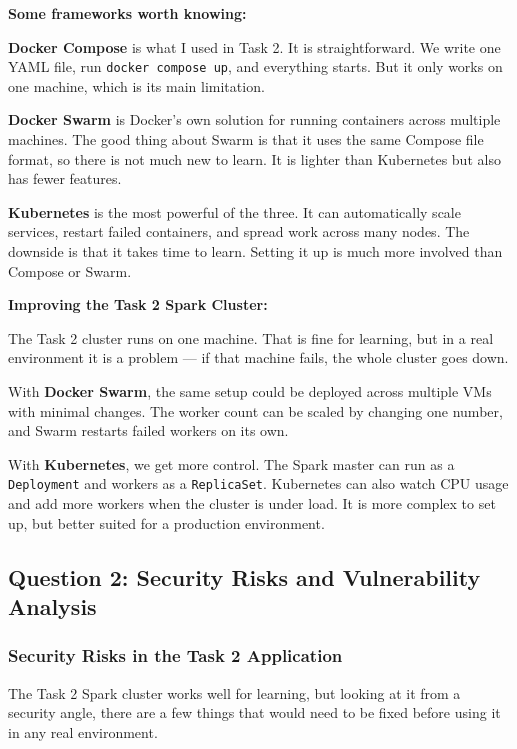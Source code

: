 \documentclass[11pt,a4paper]{article}
\begin{document}
\bigskip
\noindent\textbf{Some frameworks worth knowing:}

\textbf{Docker Compose} is what I used in Task 2. It is straightforward.
We write one YAML file, run \texttt{docker compose up}, and everything starts.
But it only works on one machine, which is its main limitation.

\textbf{Docker Swarm} is Docker's own solution for running containers across
multiple machines. The good thing about Swarm is that it uses the same Compose
file format, so there is not much new to learn. It is lighter than Kubernetes
but also has fewer features.

\textbf{Kubernetes} is the most powerful of the three. It can automatically
scale services, restart failed containers, and spread work across many nodes.
The downside is that it takes time to learn. Setting it up is much more
involved than Compose or Swarm.

\bigskip
\noindent\textbf{Improving the Task 2 Spark Cluster:}

The Task 2 cluster runs on one machine. That is fine for learning, but in a
real environment it is a problem --- if that machine fails, the whole cluster
goes down.

With \textbf{Docker Swarm}, the same setup could be deployed across multiple
VMs with minimal changes. The worker count can be scaled by changing one
number, and Swarm restarts failed workers on its own.

With \textbf{Kubernetes}, we get more control. The Spark master can run as
a \texttt{Deployment} and workers as a \texttt{ReplicaSet}. Kubernetes can
also watch CPU usage and add more workers when the cluster is under load.
It is more complex to set up, but better suited for a production environment.

\subsection{Question 2: Security Risks and Vulnerability Analysis}

\subsubsection*{Security Risks in the Task 2 Application}

The Task 2 Spark cluster works well for learning, but looking at it from a
security angle, there are a few things that would need to be fixed before
using it in any real environment.
\end{document}
